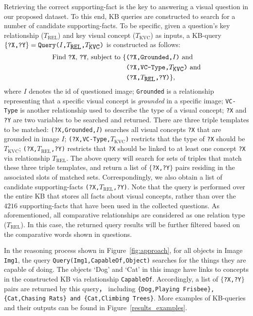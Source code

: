 \documentclass[10pt,journal]{IEEEtran}
\def\bluett{}
\begin{document}
\bluett{
Retrieving the correct supporting-fact is the key to answering a visual question in our proposed dataset. 
To this end, KB queries are constructed to search for a number of candidate supporting-facts.
To be specific, 
given a question's key relationship (\texttt{$T_{\mbox{REL}}$}) and key visual concept (\texttt{$T_{\mbox{KVC}}$}) as inputs,
a KB-query $\{ \mbox{\texttt{?X,?Y}} \} = \mbox{\texttt{Query($I$,$T_{\mbox{REL}}$,$T_{\mbox{KVC}}$)}}$ is constructed as follows:
\begin{align}
\mbox{Find \texttt{?X}, \texttt{?Y}, subject to }
\{&\mbox{\texttt{(?X,Grounded,$I$)} and} \notag \\
&\mbox{\texttt{(?X,VC-Type,$T_{\mbox{KVC}}$)}}\,\, \mbox{and} \notag \\
&\mbox{\texttt{(?X,$T_{\mbox{REL}}$,?Y)}} \}, \quad\,\,\,\, \notag
\end{align}
where $I$ denotes the id of questioned image; 
\texttt{Grounded} is a relationship representing that a specific visual concept is {\em grounded} in a specific image;
\texttt{VC-Type} is another relationship used to describe the type of a visual concept;
\texttt{?X} and \texttt{?Y} are two variables to be searched and returned.
There are three triple templates to be matched:
\texttt{(?X,Grounded,$I$)} searches all visual concepts \texttt{?X} that are grounded in image $I$;
\texttt{(?X,VC-Type,$T_{\mbox{KVC}}$)} restricts that the type of \texttt{?X} should be \texttt{$T_{\mbox{KVC}}$};
\texttt{(?X,$T_{\mbox{REL}}$,?Y)} restricts that \texttt{?X} should be linked to at least one concept  
\texttt{?X} via relationship \texttt{$T_{\mbox{REL}}$}.
The above query will search for sets of triples that match these three triple templates,
and return a list of $\{$\texttt{?X,?Y}$\}$ pairs residing in the associated slots of matched sets.
Correspondingly, we also obtain a list of candidate supporting-facts \texttt{(?X,$T_{\mbox{REL}}$,?Y)}.
Note that the query is performed over the entire KB that stores all facts about visual concepts,
rather than over the $4216$ supporting-facts that have been used in the collected questions.
As aforementioned, all comparative relationships are considered as one relation type ($T_{\mbox{REL}}$). 
In this case, the returned query results will be further filtered based on the comparative words shown in questions.}

\bluett{
In the reasoning process shown in Figure~\ref{fig:approach}, for all objects in Image \texttt{Img1}, the query \texttt{Query(Img1,CapableOf,Object)}
searches  for the things they are capable of doing.
The objects `Dog' and `Cat' in this image have links 
to concepts in the constructed KB via relationship \texttt{CapableOf}.
Accordingly, a list of $\{$\texttt{?X,?Y}$\}$ pairs are returned by this query，
including \texttt{\{Dog,Playing Frisbee\}, \{Cat,Chasing Rats\} and \{Cat,Climbing Trees\}}.
More examples of KB-queries and their outputs can be found in Figure~\ref{results_examples}.
}
\end{document}
